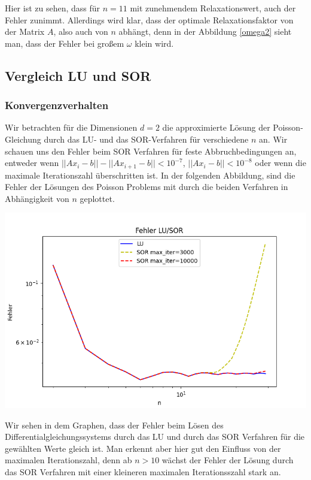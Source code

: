 \documentclass[smallheadings]{scrartcl}
\theoremstyle{definition}
\begin{document}
	Hier ist zu sehen, dass für $n=11$ mit zunehmendem Relaxationswert, auch der Fehler zunimmt. 
	Allerdings wird klar, dass der optimale Relaxationsfaktor von der Matrix $A$, also auch von $n$ abhängt, denn in der Abbildung \ref{omega2} sieht man, dass der Fehler bei großem $\omega $ klein wird. 
\subsection{Vergleich LU und SOR}
\subsubsection{Konvergenzverhalten}

Wir betrachten für die Dimensionen $d=2$ die approximierte Lösung der Poisson-Gleichung durch das LU- und das SOR-Verfahren für verschiedene  $n$ an.   Wir schauen uns den Fehler beim SOR Verfahren für feste Abbruchbedingungen an,  entweder wenn $||Ax_i-b||-||Ax_{i+1}-b||<10^{-7}$, $||Ax_i-b||<10^{-8}$ oder wenn die maximale Iterationszahl überschritten ist.  In der folgenden Abbildung,  sind die Fehler der Lösungen des Poisson Problems mit durch die beiden Verfahren in Abhängigkeit von $n$ geplottet.




\begin{minipage}{\textwidth}

 \centering
 \includegraphics[scale = 0.8]{Errorlu1}
 	\label{errorcomp}

 \end{minipage}
 
 Wir sehen in dem Graphen, dass der Fehler beim Lösen des Differentialgleichungssystems durch das LU und durch das SOR Verfahren für die gewählten Werte gleich ist.  Man erkennt aber hier gut den Einfluss von der maximalen Iterationszahl, denn ab $n>10$ wächst der Fehler der Lösung durch das SOR Verfahren mit einer kleineren maximalen Iterationsszahl stark an.
 
\end{document}
